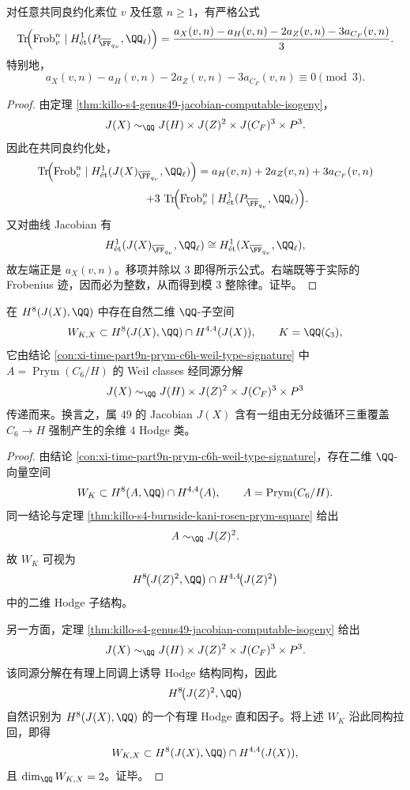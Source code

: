 \begin{conclusion}\label{con:xi-time-part9n-prym9-frobenius-trace-divisibility}
对任意共同良约化素位 \(v\) 及任意 \(n\ge 1\)，有严格公式
\[
\operatorname{Tr}\!\Bigl(
\mathrm{Frob}_v^n\mid
H^1_{\text{ét}}(P_{\overline{\FF}_{q_v}},\QQ_\ell)
\Bigr)
=
\frac{
a_X(v,n)-a_H(v,n)-2a_Z(v,n)-3a_{C_F}(v,n)
}{3}.
\]
特别地，
\[
a_X(v,n)-a_H(v,n)-2a_Z(v,n)-3a_{C_F}(v,n)\equiv 0\pmod 3.
\]
\end{conclusion}
\begin{proof}
由定理 \ref{thm:killo-s4-genus49-jacobian-computable-isogeny}，
\[
J(X)\sim_{\QQ}J(H)\times J(Z)^2\times J(C_F)^3\times P^3.
\]
因此在共同良约化处，
\[
\operatorname{Tr}\!\Bigl(
\mathrm{Frob}_v^n\mid H^1_{\text{ét}}(J(X)_{\overline{\FF}_{q_v}},\QQ_\ell)
\Bigr)
=
a_H(v,n)+2a_Z(v,n)+3a_{C_F}(v,n)
\]
\[
\qquad\qquad
+3\,\operatorname{Tr}\!\Bigl(
\mathrm{Frob}_v^n\mid H^1_{\text{ét}}(P_{\overline{\FF}_{q_v}},\QQ_\ell)
\Bigr).
\]
又对曲线 Jacobian 有
\[
H^1_{\text{ét}}(J(X)_{\overline{\FF}_{q_v}},\QQ_\ell)
\cong
H^1_{\text{ét}}(X_{\overline{\FF}_{q_v}},\QQ_\ell),
\]
故左端正是 \(a_X(v,n)\)。移项并除以 \(3\) 即得所示公式。右端既等于实际的 Frobenius 迹，因而必为整数，从而得到模 \(3\) 整除律。证毕。
\end{proof}

\begin{conclusion}\label{con:xi-time-part9n-jx-codim4-weil-hodge-classes}
在 \(H^8(J(X),\QQ)\) 中存在自然二维 \(\QQ\)-子空间
\[
W_{K,X}\subset H^8(J(X),\QQ)\cap H^{4,4}(J(X)),
\qquad K=\QQ(\zeta_3),
\]
它由结论 \ref{con:xi-time-part9n-prym-c6h-weil-type-signature} 中 \(A=\operatorname{Prym}(C_6/H)\) 的 Weil classes 经同源分解
\[
J(X)\sim_{\QQ}J(H)\times J(Z)^2\times J(C_F)^3\times P^3
\]
传递而来。换言之，属 \(49\) 的 Jacobian \(J(X)\) 含有一组由无分歧循环三重覆盖 \(C_6\to H\) 强制产生的余维 \(4\) Hodge 类。
\end{conclusion}
\begin{proof}
由结论 \ref{con:xi-time-part9n-prym-c6h-weil-type-signature}，存在二维 \(\QQ\)-向量空间
\[
W_K\subset H^8(A,\QQ)\cap H^{4,4}(A),
\qquad A=\operatorname{Prym}(C_6/H).
\]
同一结论与定理 \ref{thm:killo-s4-burnside-kani-rosen-prym-square} 给出
\[
A\sim_{\QQ}J(Z)^2.
\]
故 \(W_K\) 可视为
\[
H^8\!\bigl(J(Z)^2,\QQ\bigr)\cap H^{4,4}\!\bigl(J(Z)^2\bigr)
\]
中的二维 Hodge 子结构。

另一方面，定理 \ref{thm:killo-s4-genus49-jacobian-computable-isogeny} 给出
\[
J(X)\sim_{\QQ}J(H)\times J(Z)^2\times J(C_F)^3\times P^3.
\]
该同源分解在有理上同调上诱导 Hodge 结构同构，因此
\[
H^8\!\bigl(J(Z)^2,\QQ\bigr)
\]
自然识别为 \(H^8(J(X),\QQ)\) 的一个有理 Hodge 直和因子。将上述 \(W_K\) 沿此同构拉回，即得
\[
W_{K,X}\subset H^8(J(X),\QQ)\cap H^{4,4}(J(X)),
\]
且 \(\dim_{\QQ}W_{K,X}=2\)。证毕。
\end{proof}
